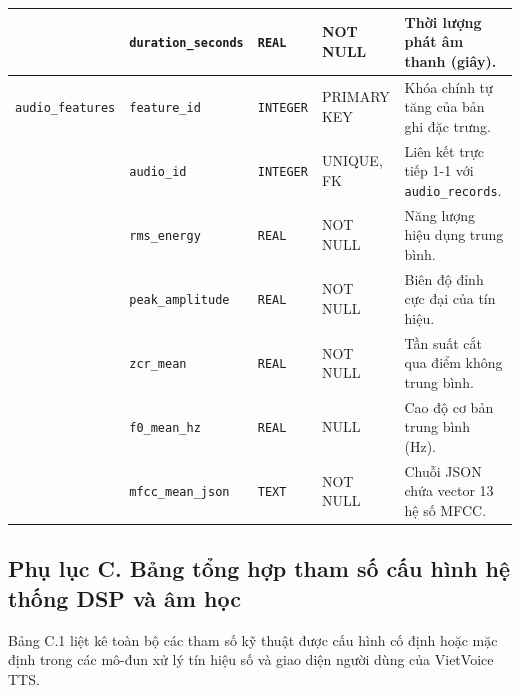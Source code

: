 \begin{table}[H]
\begin{tabularx}{\textwidth}{p{2.4cm}p{3.2cm}p{1.4cm}p{2.4cm}X}
& \texttt{duration\_seconds} & \texttt{REAL} & NOT NULL & Thời lượng phát âm thanh (giây). \\
\midrule
\texttt{audio\_features} & \texttt{feature\_id} & \texttt{INTEGER} & PRIMARY KEY & Khóa chính tự tăng của bản ghi đặc trưng. \\
& \texttt{audio\_id} & \texttt{INTEGER} & UNIQUE, FK & Liên kết trực tiếp 1-1 với \texttt{audio\_records}. \\
& \texttt{rms\_energy} & \texttt{REAL} & NOT NULL & Năng lượng hiệu dụng trung bình. \\
& \texttt{peak\_amplitude} & \texttt{REAL} & NOT NULL & Biên độ đỉnh cực đại của tín hiệu. \\
& \texttt{zcr\_mean} & \texttt{REAL} & NOT NULL & Tần suất cắt qua điểm không trung bình. \\
& \texttt{f0\_mean\_hz} & \texttt{REAL} & NULL & Cao độ cơ bản trung bình (Hz). \\
& \texttt{mfcc\_mean\_json} & \texttt{TEXT} & NOT NULL & Chuỗi JSON chứa vector 13 hệ số MFCC. \\
\bottomrule
\end{tabularx}
\end{table}

\subsection*{Phụ lục C. Bảng tổng hợp tham số cấu hình hệ thống DSP và âm học}
\label{app:dsp_parameters}

Bảng C.1 liệt kê toàn bộ các tham số kỹ thuật được cấu hình cố định hoặc mặc định trong các mô-đun xử lý tín hiệu số và giao diện người dùng của VietVoice TTS.

